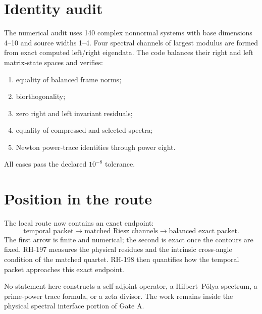 \documentclass[12pt]{article}
\theoremstyle{remark}
\begin{document}
\section{Identity audit}

The numerical audit uses 140 complex nonnormal systems with base dimensions
4--10 and source widths 1--4.  Four spectral channels of largest modulus are
formed from exact computed left/right eigendata.  The code balances their
right and left matrix-state spaces and verifies:
\begin{enumerate}[leftmargin=2em]
\item equality of balanced frame norms;
\item biorthogonality;
\item zero right and left invariant residuals;
\item equality of compressed and selected spectra;
\item Newton power-trace identities through power eight.
\end{enumerate}
All cases pass the declared $10^{-8}$ tolerance.

\section{Position in the route}

The local route now contains an exact endpoint:
\begin{equation*}
 \text{temporal packet}
 \longrightarrow
 \text{matched Riesz channels}
 \longrightarrow
 \text{balanced exact packet}.
\end{equation*}
The first arrow is finite and numerical; the second is exact once the
contours are fixed.  RH-197 measures the physical residues and the intrinsic
cross-angle condition of the matched quartet.  RH-198 then quantifies how
the temporal packet approaches this exact endpoint.

No statement here constructs a self-adjoint operator, a Hilbert--P\'olya
spectrum, a prime-power trace formula, or a zeta divisor.  The work remains
inside the physical spectral interface portion of Gate A.



\end{document}
